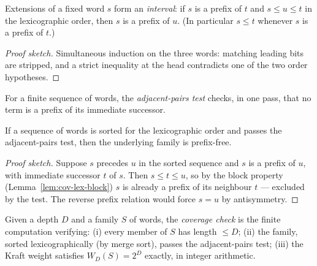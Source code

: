 \begin{lemma}\label{lem:cov-lex-block}
Extensions of a fixed word $s$ form an \emph{interval}: if $s$ is a prefix
of $t$ and $s \le u \le t$ in the lexicographic order, then $s$ is a prefix
of $u$.  (In particular $s \le t$ whenever $s$ is a prefix of $t$.)
\leanok
{}
\end{lemma}
\begin{proof}[Proof sketch]
Simultaneous induction on the three words: matching leading bits are
stripped, and a strict inequality at the head contradicts one of the two
order hypotheses.
\end{proof}

\begin{definition}\label{def:cov-adjacent}
For a finite sequence of words, the \emph{adjacent-pairs test} checks, in
one pass, that no term is a prefix of its immediate successor.
\leanok
{}
\end{definition}

\begin{lemma}\label{lem:cov-adjacent-sound}
If a sequence of words is sorted for the lexicographic order and passes the
adjacent-pairs test, then the underlying family is prefix-free.
\leanok
{}
\end{lemma}
\begin{proof}[Proof sketch]
Suppose $s$ precedes $u$ in the sorted sequence and $s$ is a prefix of $u$,
with immediate successor $t$ of $s$.  Then $s \le t \le u$, so by the block
property (Lemma~\ref{lem:cov-lex-block}) $s$ is already a prefix of its
neighbour $t$ --- excluded by the test.  The reverse prefix relation would
force $s = u$ by antisymmetry.
\end{proof}

\begin{definition}\label{def:cov-checkcover}
Given a depth $D$ and a family $S$ of words, the \emph{coverage check} is
the finite computation verifying:
(i) every member of $S$ has length $\le D$;
(ii) the family, sorted lexicographically (by merge sort), passes the
adjacent-pairs test;
(iii) the Kraft weight satisfies $W_D(S) = 2^D$ exactly, in integer
arithmetic.
\leanok
{}
\end{definition}

